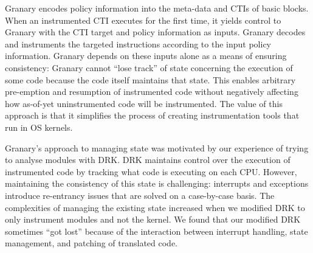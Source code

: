 \documentclass[letterpaper,twocolumn,10pt]{article}
\begin{document}
Granary encodes policy information into the meta-data and CTIs of basic blocks. When an instrumented CTI executes for the first time, it yields control to Granary with the CTI target and policy information as inputs. Granary decodes and instruments the targeted instructions according to the input policy information. Granary depends on these inputs alone as a means of ensuring consistency: Granary cannot ``lose track'' of state concerning the execution of some code because the code itself maintains that state.  This enables arbitrary pre-emption and resumption of instrumented code without negatively affecting how as-of-yet uninstrumented code will be instrumented. The value of this approach is that it simplifies the process of creating instrumentation tools that run in OS kernels.

Granary's approach to managing state was motivated by our experience of trying to analyse modules with DRK. DRK maintains control over the execution of instrumented code by tracking what code is executing on each CPU. However, maintaining the consistency of this state is challenging: interrupts and exceptions introduce re-entrancy issues that are solved on a case-by-case basis. The complexities of managing the existing state increased when we modified DRK to only instrument modules and not the kernel. We found that our modified DRK sometimes ``got lost'' because of the interaction between interrupt handling, state management, and patching of translated code.
\end{document}

